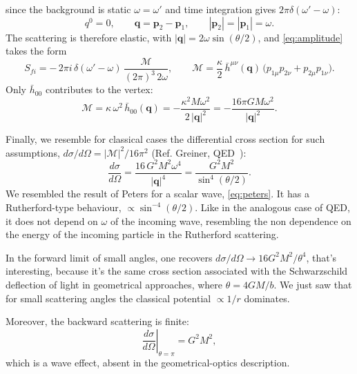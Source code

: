 \documentclass[12pt,a4paper,oneside]{article}
\numberwithin{equation}{section}   %
\begin{document}
since the background is static $\omega=\omega'$ and time integration
gives $2\pi\delta(\omega'-\omega)$:
\begin{equation}
    \label{eq:elastic}
    q^{0}=0,\qquad
    \mathbf{q}=\mathbf{p}_2-\mathbf{p}_1,\qquad
    |\mathbf{p}_2|=|\mathbf{p}_1|=\omega .
\end{equation}
The scattering is therefore elastic, with $|\mathbf{q}|=2\omega\sin(\theta/2)$,
and \eqref{eq:amplitude} takes the form
\begin{equation}
    S_{fi}=-\,2\pi i\,\delta(\omega'-\omega)\,
    \frac{\mathcal M}{(2\pi)^3\,2\omega},
    \qquad
    \mathcal M=\frac{\kappa}{2}\,\bar h^{\mu\nu}(\mathbf q)\,
    \bigl(p_{1\mu} p_{2\nu}+p_{2\mu} p_{1\nu}\bigr).
    \label{eq:M-ext}
\end{equation}
Only $\bar h_{00}$ contributes to the vertex:
\begin{equation}
    \label{eq:M-schw}
    \mathcal M=\kappa\,\omega^2\,\bar h_{00}(\mathbf q)
    =-\frac{\kappa^2M\omega^2}{2\,|\mathbf q|^2}
    =-\frac{16\pi GM\omega^2}{|\mathbf q|^2}.
\end{equation}

Finally, we resemble for classical cases the differential cross section for such
assumptions,
$d\sigma/d\Omega=|\mathcal M|^2/16\pi^2$ (Ref. Greiner, QED~\cite{GreinerQED}):
\begin{equation}
    \label{eq:xsec-schw}
    \boxed{
    \frac{d\sigma}{d\Omega}
    = \frac{16\,G^2M^2\omega^4}{|\mathbf q|^4}
    =\frac{G^2M^2}{\sin^{4}(\theta/2)}.
    }
\end{equation}
We resembled the result of Peters for a scalar wave, \eqref{eq:peters}.
It has a Rutherford-type behaviour, $\propto\sin^{-4}(\theta/2)$. 
Like in the analogous
 case of QED, it does not depend on $\omega$ of the
incoming wave, resembling the non dependence on the 
energy of the incoming particle in the Rutherford scattering.

In the forward limit of small angles, one recovers
$d\sigma/d\Omega\to 16G^{2}M^{2}/\theta^{4}$, that's interesting, 
because it's the same cross section associated
with the Schwarzschild deflection of light in geometrical 
approaches, where $\theta=4GM/b$. We just saw that for small
scattering angles the classical potential $\propto 1/r$ dominates.

Moreover, the backward scattering is finite:
\begin{equation}
    \label{eq:backward}
    \left.\frac{d\sigma}{d\Omega}\right|_{\theta=\pi}
    = G^{2}M^{2},
\end{equation}
which is a wave effect, absent in the geometrical-optics description.
\end{document}
